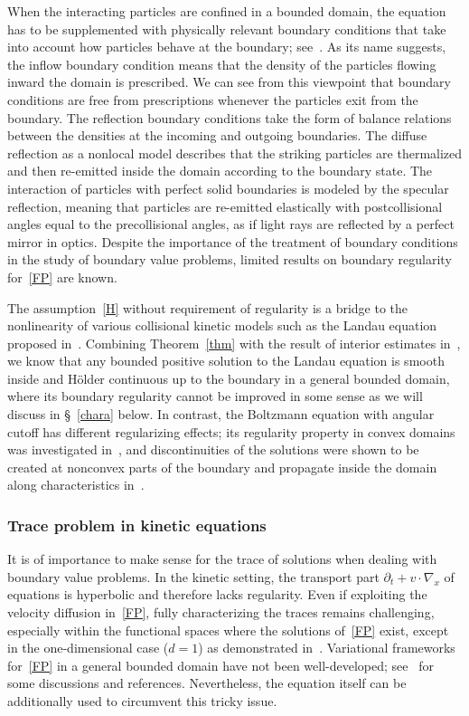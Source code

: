 \documentclass[10pt]{amsart}
\theoremstyle{definition}\newtheorem{defi}[theo]{Definition}\newtheorem{rema}[theo]{Remark}\newtheorem{exam}[theo]{Example}\newtheorem{exem}[theo]{Example}\newtheorem{nota}[theo]{Notation}
\newcommand*\p{\partial}
\begin{document}
When the interacting particles are confined in a bounded domain, the equation has to be supplemented with physically relevant boundary conditions that take into account how particles behave at the boundary; see~\cite{Cerci2,Maxwell}. As its name suggests, the inflow boundary condition means that the density of the particles flowing inward the domain is prescribed. We can see from this viewpoint that boundary conditions are free from prescriptions whenever the particles exit from the boundary. The reflection boundary conditions take the form of balance relations between the densities at the incoming and outgoing boundaries. The diffuse reflection as a nonlocal model describes that the striking particles are thermalized and then re-emitted inside the domain according to the boundary state. The interaction of particles with perfect solid boundaries is modeled by the specular reflection, meaning that particles are re-emitted elastically with postcollisional angles equal to the precollisional angles, as if light rays are reflected by a perfect mirror in optics. Despite the importance of the treatment of boundary conditions in the study of boundary value problems, limited results on boundary regularity for~\eqref{FP} are known.

The assumption~\eqref{H} without requirement of regularity is a bridge to the nonlinearity of various collisional kinetic models such as the Landau equation proposed in~\cite{Landau}. Combining Theorem~\ref{thm} with the result of interior estimates in~\cite{HS}, we know that any bounded positive solution to the Landau equation is smooth inside and H\"older continuous up to the boundary in a general bounded domain, where its boundary regularity cannot be improved in some sense as we will discuss in \S~\ref{chara} below. In contrast, the Boltzmann equation with angular cutoff has different regularizing effects; its regularity property in convex domains was investigated in~\cite{GKTT}, and discontinuities of the solutions were shown to be created at nonconvex parts of the boundary and propagate inside the domain along characteristics in~\cite{Kim}.

\subsubsection{Trace problem in kinetic equations}\label{trace-pro}
It is of importance to make sense for the trace of solutions when dealing with boundary value problems. In the kinetic setting, the transport part $\p_t+v\cdot\nabla_x$ of equations is hyperbolic and therefore lacks regularity. Even if exploiting the velocity diffusion in~\eqref{FP}, fully characterizing the traces remains challenging, especially within the functional spaces where the solutions of~\eqref{FP} exist, except in the one-dimensional case ($d=1$) as demonstrated in~\cite[Theorem~1]{BG}. Variational frameworks for~\eqref{FP} in a general bounded domain have not been well-developed; see~\cite{AM2021} for some discussions and references. Nevertheless, the equation itself can be additionally used to circumvent this tricky issue.
\end{document}
